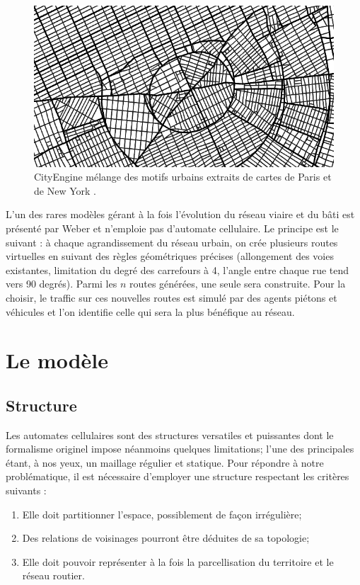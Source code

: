 \documentclass[12pt]{article}
\begin{document}
\begin{figure}[H]
  \centering
  \includegraphics[width=.8\linewidth]{images/cityengine.png}
  \caption{CityEngine mélange des motifs urbains extraits de cartes de
    Paris et de New York \cite{Parish2001}.}
  \label{fig:cityengine}
\end{figure}

L'un des rares modèles gérant à la fois l'évolution du réseau viaire
et du bâti est présenté par Weber \cite{Weber2009} et n'emploie pas
d'automate cellulaire. Le principe est le suivant : à chaque
agrandissement du réseau urbain, on crée plusieurs routes virtuelles
en suivant des règles géométriques précises (allongement des voies
existantes, limitation du degré des carrefours à 4, l'angle entre
chaque rue tend vers 90 degrés). Parmi les $n$ routes générées, une
seule sera construite. Pour la choisir, le traffic sur ces nouvelles
routes est simulé par des agents piétons et véhicules et l'on
identifie celle qui sera la plus bénéfique au réseau.

\section{Le modèle}

\subsection{Structure}

Les automates cellulaires sont des structures versatiles et puissantes
dont le formalisme originel impose néanmoins quelques limitations;
l'une des principales étant, à nos yeux, un maillage régulier et
statique. Pour répondre à notre problématique, il est nécessaire
d'employer une structure respectant les critères suivants :

\begin{enumerate}
\item{Elle doit partitionner l'espace, possiblement de façon
  irrégulière;}
\item{Des relations de voisinages pourront être déduites de sa
  topologie;}
\item{Elle doit pouvoir représenter à la fois la parcellisation du
  territoire et le réseau routier.}
\end{enumerate}
\end{document}
